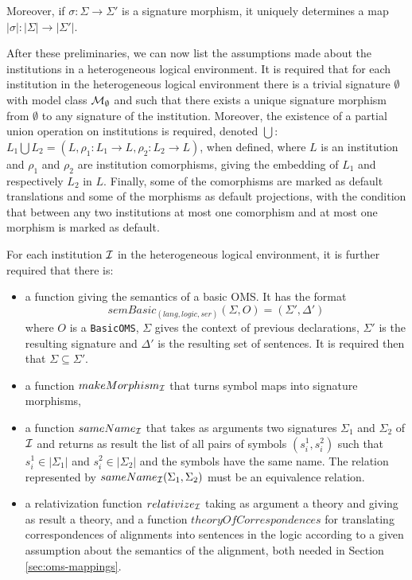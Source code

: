 \documentclass[10pt, a4paper]{isov2}
\newcommand*{\syntax}[1]{\texttt{#1}}
\begin{document}
Moreover, if $\sigma:\Sigma\to\Sigma'$ is a signature morphism,
it uniquely determines a map $|\sigma|:|\Sigma|\to|\Sigma'|$.

After these preliminaries, we can now list the assumptions made about the
institutions in a heterogeneous logical environment.
It is required that for each institution in the heterogeneous logical environment there is a trivial signature
$\emptyset$ with model class ${\cal M}_\emptyset$ and such that there exists a unique signature morphism
from $\emptyset$ to any signature of the institution. Moreover, the existence of a partial union operation on institutions is required, denoted $\bigcup$: 
$L_1 \bigcup L_2 = (L, \rho_1:L_1 \to L, \rho_2 : L_2 \to L)$, when defined, where
$L$ is an institution and $\rho_1$ and
$\rho_2$ are institution comorphisms, giving the embedding of $L_1$ and
respectively $L_2$ in $L$. Finally, some of the comorphisms are marked as default translations and some of the morphisms as default projections, with the condition that between any two institutions at most one comorphism and at most one morphism is marked as default.

For each institution ${\cal I}$
in the heterogeneous logical environment, it is further required that
there is:
%
\begin{itemize}
  \item  a function giving the semantics of a basic OMS. It has the format
$$\mathit{semBasic}_{(lang,logic,ser)}(\Sigma,O) = (\Sigma',\Delta')$$
where $O$ is a \syntax{BasicOMS}, $\Sigma$ gives the context of previous declarations, $\Sigma'$ is the resulting
signature and $\Delta'$ is the resulting set of sentences.
 It is required then that $\Sigma\subseteq\Sigma'$.
  \item a function $makeMorphism_{\cal I}$ that turns symbol maps into signature morphisms,
  \item a function $sameName_{\cal I}$ that takes as arguments two signatures 
  $\Sigma_1$ and $\Sigma_2$ of ${\cal I}$
  and returns as result the list of all pairs of symbols $(s^1_i,s^2_i)$ such that
  $s^1_i\in|\Sigma_1|$ and $s^2_i\in|\Sigma_2|$ and the symbols have the same name.
  The relation represented by $sameName_{\cal I}(\Sigma_1,\Sigma_2)$ must be an
  equivalence relation.
  \item a relativization function $relativize_{\cal I}$ 
  taking as argument a theory and giving as 
  result a theory, and a function
  $theoryOfCorrespondences$ for translating correspondences of alignments
  into sentences in the logic according to a given assumption about the
  semantics of the alignment, both needed in Section \ref{sec:oms-mappings}.
\end{itemize}
\end{document}
